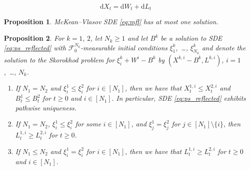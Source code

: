 \documentclass[10pt,a4paper]{amsart}
\newtheorem{proposition}{Proposition}
\newcommand{\F}{\mathcal{F}}
\renewcommand{\d}{\mathrm{d}}
\begin{document}
\begin{equation} \label{eq:mfl}
    \d X_t =  \d W_t + \d L_t
\end{equation}

\begin{proposition} \label{prop:mfl_strong_uniqueness}
McKean--Vlasov SDE \eqref{eq:mfl} has at most one solution.
\end{proposition}

\begin{proposition} \label{prop:comparison}
For $k = 1$, $2$, let $N_k \geq 1$ and let $B^k$ be a solution to SDE \eqref{eq:ps_reflected} with $\F^{N_k}_0$-measurable initial conditions $\xi^k_1$,~\ldots, $\xi^k_{N_k}$ and denote the solution to the Skorokhod problem for $\xi^k_i + W^i - B^k$ by $(X^{k, i} - B^k, L^{k, i})$, $i = 1$,~\ldots, $N_k$. 
\begin{enumerate}[noitemsep, label = (\roman*)]
    \item \label{it:comparison} If $N_1 = N_2$ and $\xi^1_i \leq \xi^2_i$ for $i \in [N_1]$, then we have that $X^{1, i}_t \leq X^{2, i}_t$ and $B^1_t \leq B^2_t$ for $t \geq 0$ and $i \in [N_1]$. In particular, SDE \eqref{eq:ps_reflected} exhibits pathwise uniqueness.
    \item \label{it:comparison_local} If $N_1 = N_2$, $\xi^1_i \leq \xi^2_i$ for some $i \in [N_1]$, and $\xi^1_j = \xi^2_j$ for $j \in [N_1] \setminus \{i\}$, then $L^{1, i}_t \geq L^{2, i}_t$ for $t \geq 0$.
    \item \label{it:comparison_number} If $N_1 \leq N_2$ and $\xi^1_i = \xi^2_i$ for $i \in [N_1]$, then we have that $L^{1, i}_t \geq L^{2, i}_t$ for $t \geq 0$ and  $i \in [N_1]$.
\end{enumerate}
\end{proposition}
\end{document}

